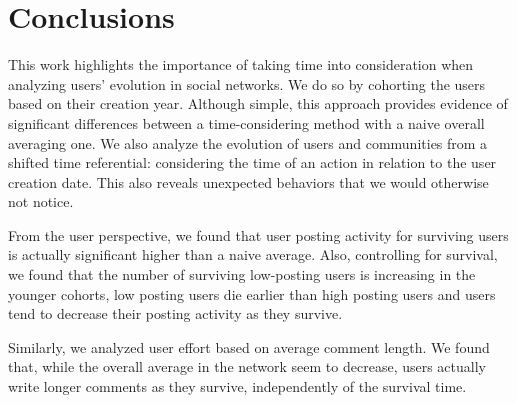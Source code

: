 %

\section{Conclusions}

This work highlights the importance of taking time into consideration when analyzing users' evolution in social networks. We do so by cohorting the users based on their creation year. Although simple, this approach provides evidence of significant differences between a time-considering method with a naive overall averaging one. We also analyze the evolution of users and communities from a shifted time referential: considering the time of an action in relation to the user creation date. This also reveals unexpected behaviors that we would otherwise not notice.

From the user perspective, we found that user posting activity for surviving users is actually significant higher than a naive average. Also, controlling for survival, we found that the number of surviving low-posting users is increasing in the younger cohorts, low posting users die earlier than high posting users and users tend to decrease their posting activity as they survive.

Similarly, we analyzed user effort based on average comment length. We found that, while the overall average in the network seem to decrease, users actually write longer comments as they survive, independently of the survival time. %